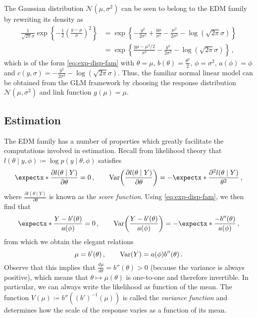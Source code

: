\documentclass[a4paper]{book}
\begin{document}
The Gaussian distribution $\mathcal{N}(\mu, \sigma^2)$ can be seen to belong to the EDM family by rewriting its density as
\begin{align}
  \frac{1}{\sqrt{2 \pi} \sigma} \exp \left \{ -\frac{1}{2} \left( \frac{y - \mu}{\sigma} \right)^2\right \} & = \exp \left \{ -\frac{y^2}{2 \sigma^2} + \frac{y \mu}{\sigma^2} - \frac{\mu^2}{2 \sigma^2} - \log(\sqrt{2 \pi} \sigma) \right \} \\
                                                                                                            & = \exp \left \{ \frac{y \mu - \mu^2 / 2}{\sigma^2} - \frac{y^2}{2 \sigma^2} - \log(\sqrt{2 \pi} \sigma) \right \} \,,
\end{align}
which is of the form \cref{eq:exp-disp-fam} with $\theta = \mu$, $b(\theta) = \frac{\theta^2}{2}$, $\phi = \sigma^2$, $a(\phi) = \phi$ and $c(y, \sigma) = -\frac{y^2}{2 \sigma^2} - \log(\sqrt{2 \pi} \sigma)$. Thus, the familiar normal linear model can be obtained from the GLM framework by choosing the response distribution $\mathcal{N}(\mu, \sigma^2)$ and link function $g(\mu) = \mu$.

\subsection{Estimation}

The EDM family has a number of properties which greatly facilitate the computations involved in estimation. Recall from likelihood theory that $l(\theta \mid y, \phi) \coloneqq \log p(y \mid \theta, \phi)$ satisfies
\begin{equation} \label{eq:exp-var-likelihood}
  \expect{\frac{\partial l(\theta \mid Y)}{\partial \theta}} = 0 \,, \qquad \var{\frac{\partial l(\theta \mid Y)}{\partial \theta}} = -\expect{\frac{\partial^2 l(\theta \mid Y)}{\theta^2}} \,,
\end{equation}
where $\frac{\partial l(\theta \mid Y)}{\partial \theta}$ is known as the \emph{score function}. Using \cref{eq:exp-disp-fam}, we then find that
\begin{equation}
  \expect{\frac{Y - b'(\theta)}{a(\phi)}} = 0 \,, \qquad \var{\frac{Y - b'(\theta)}{a(\phi)}} = -\expect{\frac{-b''(\theta)}{a(\phi)}} \,,
\end{equation}
from which we obtain the elegant relations
\begin{equation}
  \mu = b'(\theta) \,, \qquad \var{Y} = a(\phi) b''(\theta) \,.
\end{equation}
Observe that this implies that $\frac{d \mu}{d \theta} = b''(\theta) > 0$ (because the variance is always positive), which means that $\theta \mapsto \mu(\theta)$ is one-to-one and therefore invertible. In particular, we can always write the likelihood as function of the mean. The function $V(\mu) \coloneqq b''((b')^{-1}(\mu))$ is called the \emph{variance function} and determines how the scale of the response varies as a function of its mean.
\end{document}

